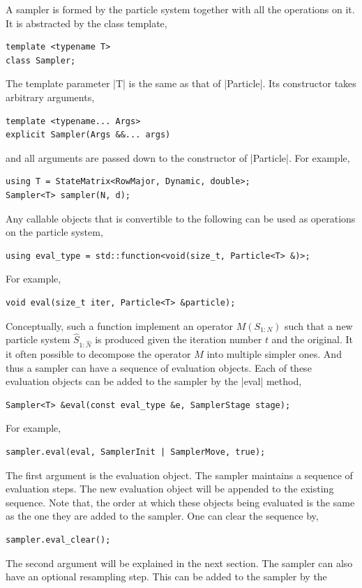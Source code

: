 A sampler is formed by the particle system together with all the operations on
it. It is abstracted by the class template,
\begin{Verbatim}
template <typename T>
class Sampler;
\end{Verbatim}
The template parameter |T| is the same as that of |Particle|. Its constructor
takes arbitrary arguments,
\begin{Verbatim}
template <typename... Args>
explicit Sampler(Args &&... args)
\end{Verbatim}
and all arguments are passed down to the constructor of |Particle|. For
example,
\begin{Verbatim}
using T = StateMatrix<RowMajor, Dynamic, double>;
Sampler<T> sampler(N, d);
\end{Verbatim}
Any callable objects that is convertible to the following can be used as
operations on the particle system,
\begin{Verbatim}
using eval_type = std::function<void(size_t, Particle<T> &)>;
\end{Verbatim}
For example,
\begin{Verbatim}
void eval(size_t iter, Particle<T> &particle);
\end{Verbatim}
Conceptually, such a function implement an operator $M(S_{1:N})$ such that a
new particle system $\hat{S}_{1:\hat{N}}$ is produced given the iteration
number $t$ and the original. It it often possible to decompose the operator $M$
into multiple simpler ones. And thus a sampler can have a sequence of
evaluation objects. Each of these evaluation objects can be added to the
sampler by the |eval| method,
\begin{Verbatim}
Sampler<T> &eval(const eval_type &e, SamplerStage stage);
\end{Verbatim}
For example,
\begin{Verbatim}
sampler.eval(eval, SamplerInit | SamplerMove, true);
\end{Verbatim}
The first argument is the evaluation object. The sampler maintains a sequence
of evaluation steps. The new evaluation object will be appended to the existing
sequence. Note that, the order at which these objects being evaluated is the
same as the one they are added to the sampler. One can clear the sequence by,
\begin{Verbatim}
sampler.eval_clear();
\end{Verbatim}
The second argument will be explained in the next section. The sampler can also
have an optional resampling step. This can be added to the sampler by the
